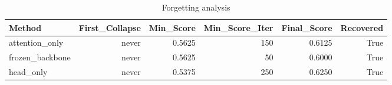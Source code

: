 \begin{table}[htbp]
\centering
\caption{Forgetting analysis}
\label{tab:forgetting}
\begin{tabular}{lrrrrr}
\toprule
\textbf{Method} & \textbf{First\_Collapse} & \textbf{Min\_Score} & \textbf{Min\_Score\_Iter} & \textbf{Final\_Score} & \textbf{Recovered} \\
\midrule
attention\_only & never & 0.5625 & 150 & 0.6125 & True \\
frozen\_backbone & never & 0.5625 & 50 & 0.6000 & True \\
head\_only & never & 0.5375 & 250 & 0.6250 & True \\
\bottomrule
\end{tabular}
\end{table}